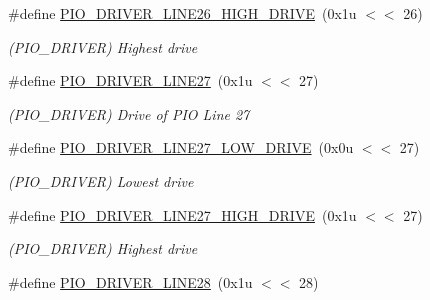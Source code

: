 \begin{DoxyCompactItemize}
\mbox{\label{group__SAMV71__PIO_ga8b6150e742267820e0c4b032ff1933b6}} 
\#define \mbox{\hyperlink{group__SAMV71__PIO_ga8b6150e742267820e0c4b032ff1933b6}{P\+I\+O\+\_\+\+D\+R\+I\+V\+E\+R\+\_\+\+L\+I\+N\+E26\+\_\+\+H\+I\+G\+H\+\_\+\+D\+R\+I\+VE}}~(0x1u $<$$<$ 26)
\begin{DoxyCompactList}\small\item\em (P\+I\+O\+\_\+\+D\+R\+I\+V\+ER) Highest drive \end{DoxyCompactList}\item 
\mbox{\label{group__SAMV71__PIO_ga2cc35454f532930c50bf926ef4116c08}} 
\#define \mbox{\hyperlink{group__SAMV71__PIO_ga2cc35454f532930c50bf926ef4116c08}{P\+I\+O\+\_\+\+D\+R\+I\+V\+E\+R\+\_\+\+L\+I\+N\+E27}}~(0x1u $<$$<$ 27)
\begin{DoxyCompactList}\small\item\em (P\+I\+O\+\_\+\+D\+R\+I\+V\+ER) Drive of P\+IO Line 27 \end{DoxyCompactList}\item 
\mbox{\label{group__SAMV71__PIO_gaccde0c046764f70a74c055f1f1419702}} 
\#define \mbox{\hyperlink{group__SAMV71__PIO_gaccde0c046764f70a74c055f1f1419702}{P\+I\+O\+\_\+\+D\+R\+I\+V\+E\+R\+\_\+\+L\+I\+N\+E27\+\_\+\+L\+O\+W\+\_\+\+D\+R\+I\+VE}}~(0x0u $<$$<$ 27)
\begin{DoxyCompactList}\small\item\em (P\+I\+O\+\_\+\+D\+R\+I\+V\+ER) Lowest drive \end{DoxyCompactList}\item 
\mbox{\label{group__SAMV71__PIO_gaf0ef835d14555a19fdcb00c6466e0370}} 
\#define \mbox{\hyperlink{group__SAMV71__PIO_gaf0ef835d14555a19fdcb00c6466e0370}{P\+I\+O\+\_\+\+D\+R\+I\+V\+E\+R\+\_\+\+L\+I\+N\+E27\+\_\+\+H\+I\+G\+H\+\_\+\+D\+R\+I\+VE}}~(0x1u $<$$<$ 27)
\begin{DoxyCompactList}\small\item\em (P\+I\+O\+\_\+\+D\+R\+I\+V\+ER) Highest drive \end{DoxyCompactList}\item 
\mbox{\label{group__SAMV71__PIO_ga362532adc5d58c79cba154c0818df0c0}} 
\#define \mbox{\hyperlink{group__SAMV71__PIO_ga362532adc5d58c79cba154c0818df0c0}{P\+I\+O\+\_\+\+D\+R\+I\+V\+E\+R\+\_\+\+L\+I\+N\+E28}}~(0x1u $<$$<$ 28)
$$
\end{DoxyCompactItemize}
